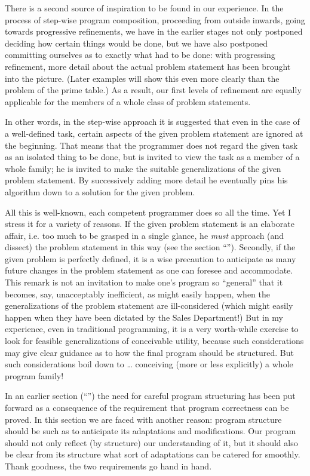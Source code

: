 There is a second source of inspiration to be found in our experience. In the process of step-wise program composition, proceeding from outside inwards, going towards progressive refinements, we have in the earlier stages not only postponed deciding how certain things would be done, but we have also postponed committing ourselves as to exactly what had to be done: with progressing refinement, more detail about the actual problem statement has been brought into the picture. (Later examples will show this even more clearly than the problem of the prime table.) As a result, our first levels of refinement are equally applicable for the members of a whole class of problem statements.

In other words, in the step-wise approach it is suggested that even in the case of a well-defined task, certain aspects of the given problem statement are ignored at the beginning. That means that the programmer does not regard the given task as an isolated thing to be done, but is invited to view the task as a member of a whole family; he is invited to make the suitable generalizations of the given problem statement. By successively adding more detail he eventually pins his algorithm down to a solution for the given problem.

All this is well-known, each competent programmer does so all the time. Yet I stress it for a variety of reasons. If the given problem statement is an elaborate affair, i.e. too much to be grasped in a single glance, he \textit{must} approach (and dissect) the problem statement in this way (see the section ``''). Secondly, if the given problem is perfectly defined, it is a wise precaution to anticipate as many future changes in the problem statement as one can foresee and accommodate. This remark is not an invitation to make one's program so ``general'' that it becomes, say, unacceptably inefficient, as might easily happen, when the generalizations of the problem statement are ill-considered (which might easily happen when they have been dictated by the Sales Department!) But in my experience, even in traditional programming, it is a very worth-while exercise to look for feasible generalizations of conceivable utility, because such considerations may give clear guidance as to how the final program should be structured. But such considerations boil down to \dots{} conceiving (more or less explicitly) a whole program family!

In an earlier section (``'') the need for careful program structuring has been put forward as a consequence of the requirement that program correctness can be proved. In this section we are faced with another reason: program structure should be such as to anticipate its adaptations and modifications. Our program should not only reflect (by structure) our understanding of it, but it should also be clear from its structure what sort of adaptations can be catered for smoothly. Thank goodness, the two requirements go hand in hand.

